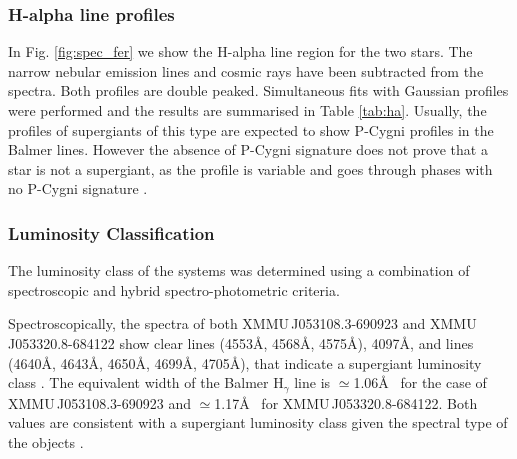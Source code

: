 \documentclass[a4paper,fleqn,usenatbib]{mnras}
\newcommand{\canda}{XMMU\,J053108.3-690923\xspace} %
\newcommand{\candb}{XMMU\,J053320.8-684122\xspace} %
\begin{document}
\begin{figure*}
  \caption{FEROS spectra of \canda and \candb. Intensities have been normalised according to the underlying continuum flux and arbitrarily shifted for plotting purposes. Lines that have been used for the spectral classification are marked with vertical dashed red lines.   
  } 
  \vspace{-0.5cm}
  \label{fig:spec_fer}
\end{figure*}

\subsubsection{H-alpha line profiles}
In Fig. \ref{fig:spec_fer} we show the H-alpha line region for the two stars. The narrow nebular emission lines and cosmic rays have been subtracted from the spectra.
Both profiles are double peaked. Simultaneous fits with Gaussian profiles were performed and the results are summarised in Table \ref{tab:ha}.
Usually, the profiles of supergiants of this type are expected to show P-Cygni profiles in the Balmer lines. However the absence of P-Cygni signature does not prove that a star is not a supergiant, as the profile is variable and goes through phases with no P-Cygni signature \citep[e.g. ][]{2007ApJ...656..437G,2006ESASP.604..165N}.




\subsubsection{Luminosity Classification}
The luminosity class of the systems was determined using a combination of spectroscopic and hybrid spectro-photometric criteria. 

Spectroscopically, the spectra of both \canda and \candb show clear  lines (4553\AA, 4568\AA, 4575\AA),  4097\AA, and  lines (4640\AA, 4643\AA, 4650\AA, 4699\AA, 4705\AA), that indicate a supergiant luminosity class \citep{2008MNRAS.388.1127H}. 
The equivalent width of the Balmer H$_{\gamma}$ line is $\simeq$1.06\AA~ for the case of \canda and $\simeq$1.17\AA~ for \candb. Both values are consistent with a supergiant luminosity class given the spectral type of the objects \citep[see e.g.][]{1993A&AS..101..599C}. 
\end{document}
